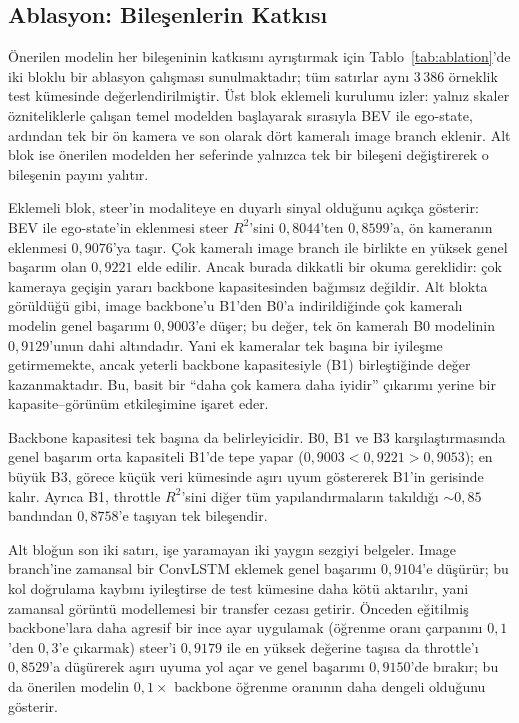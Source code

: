 \documentclass[conference]{IEEEtran}
\begin{document}
\subsection{Ablasyon: Bileşenlerin Katkısı}

Önerilen modelin her bileşeninin katkısını ayrıştırmak için Tablo~\ref{tab:ablation}'de iki bloklu bir ablasyon çalışması sunulmaktadır; tüm satırlar aynı $3\,386$ örneklik test kümesinde değerlendirilmiştir. Üst blok eklemeli kurulumu izler: yalnız skaler özniteliklerle çalışan temel modelden başlayarak sırasıyla BEV ile ego-state, ardından tek bir ön kamera ve son olarak dört kameralı image branch eklenir. Alt blok ise önerilen modelden her seferinde yalnızca tek bir bileşeni değiştirerek o bileşenin payını yalıtır.

Eklemeli blok, steer'in modaliteye en duyarlı sinyal olduğunu açıkça gösterir: BEV ile ego-state'in eklenmesi steer $R^2$'sini $0{,}8044$'ten $0{,}8599$'a, ön kameranın eklenmesi $0{,}9076$'ya taşır. Çok kameralı image branch ile birlikte en yüksek genel başarım olan $0{,}9221$ elde edilir. Ancak burada dikkatli bir okuma gereklidir: çok kameraya geçişin yararı backbone kapasitesinden bağımsız değildir. Alt blokta görüldüğü gibi, image backbone'u B1'den B0'a indirildiğinde çok kameralı modelin genel başarımı $0{,}9003$'e düşer; bu değer, tek ön kameralı B0 modelinin $0{,}9129$'unun dahi altındadır. Yani ek kameralar tek başına bir iyileşme getirmemekte, ancak yeterli backbone kapasitesiyle (B1) birleştiğinde değer kazanmaktadır. Bu, basit bir ``daha çok kamera daha iyidir'' çıkarımı yerine bir kapasite--görünüm etkileşimine işaret eder.

Backbone kapasitesi tek başına da belirleyicidir. B0, B1 ve B3 karşılaştırmasında genel başarım orta kapasiteli B1'de tepe yapar ($0{,}9003 < 0{,}9221 > 0{,}9053$); en büyük B3, görece küçük veri kümesinde aşırı uyum göstererek B1'in gerisinde kalır. Ayrıca B1, throttle $R^2$'sini diğer tüm yapılandırmaların takıldığı $\sim\!0{,}85$ bandından $0{,}8758$'e taşıyan tek bileşendir.

Alt bloğun son iki satırı, işe yaramayan iki yaygın sezgiyi belgeler. Image branch'ine zamansal bir ConvLSTM eklemek genel başarımı $0{,}9104$'e düşürür; bu kol doğrulama kaybını iyileştirse de test kümesine daha kötü aktarılır, yani zamansal görüntü modellemesi bir transfer cezası getirir. Önceden eğitilmiş backbone'lara daha agresif bir ince ayar uygulamak (öğrenme oranı çarpanını $0{,}1$'den $0{,}3$'e çıkarmak) steer'i $0{,}9179$ ile en yüksek değerine taşısa da throttle'ı $0{,}8529$'a düşürerek aşırı uyuma yol açar ve genel başarımı $0{,}9150$'de bırakır; bu da önerilen modelin $0{,}1\times$ backbone öğrenme oranının daha dengeli olduğunu gösterir.
\end{document}
